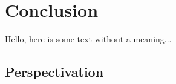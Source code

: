 \documentclass[../main.tex]{subfiles}
\begin{document}
\section{Conclusion}
Hello, here is some text without a meaning...

\subsection{Perspectivation}
\end{document}
